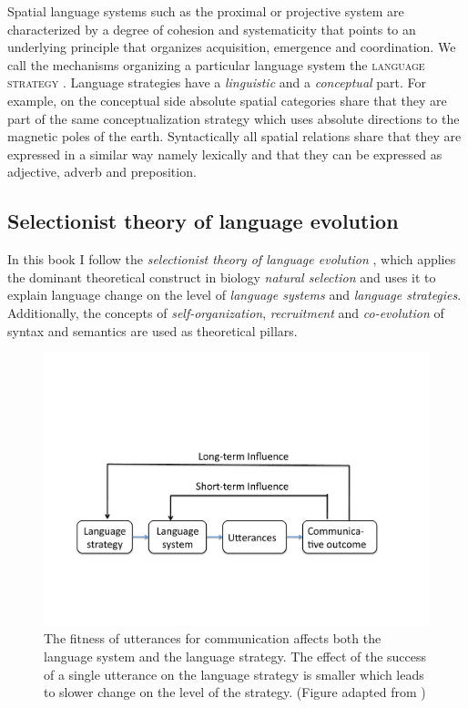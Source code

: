 Spatial language systems such as the proximal or projective system 
are characterized by a degree of cohesion and systematicity 
that points to an underlying principle that organizes acquisition, emergence 
and coordination. We call the mechanisms organizing a particular language
system the \textsc{language strategy} \citep{steels2011self-organization}.
Language strategies have a \emph{linguistic} and a \emph{conceptual} 
part. For example, on the conceptual 
side absolute spatial categories share that they
are part of the same conceptualization strategy which uses absolute directions
to the magnetic poles of the earth. Syntactically all spatial relations share
that they are expressed in a similar way namely lexically and that they can
be expressed as adjective, adverb and preposition. 


\subsection{Selectionist theory of language evolution}
In this book I follow the \emph{selectionist theory of language evolution} 
\citep{steels2011self-organization}, which applies the dominant theoretical construct 
in biology \emph{natural selection} and uses it to explain language change
on the level of \emph{language systems} and \emph{language strategies}.
Additionally, the concepts of \emph{self-organization},
\emph{recruitment} and \emph{co-evolution} of syntax and semantics are
used as theoretical pillars.

\begin{figure}
\begin{center}
\includegraphics[width=0.7\columnwidth]{figs/select-strat}
\end{center}
\caption[Selective pressures on language systems and strategies]{The fitness of utterances for communication affects both the language
system and the language strategy. The effect of the success of a single utterance 
on the language strategy is smaller which leads to slower change on the level 
of the strategy. (Figure adapted from \citealp{steels2011self-organization})}
\label{f:strategy-system-selection}
\end{figure}




